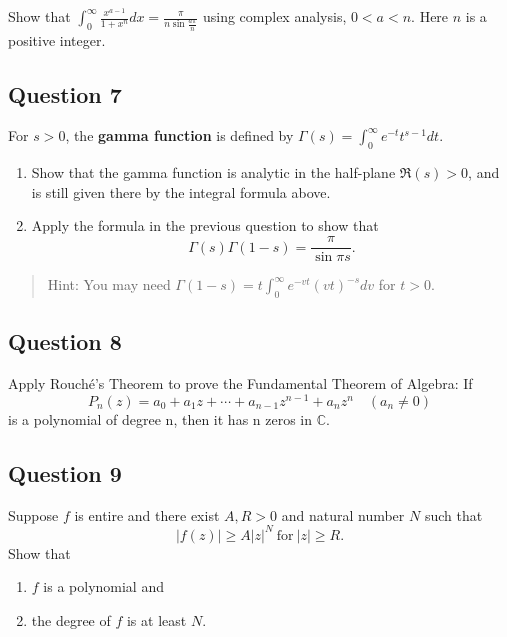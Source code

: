 \documentclass[12pt]{article}
\begin{document}
Show that
\(\displaystyle \int_0^\infty \frac{x^{a-1}}{1+x^n} dx=\frac{\pi}{n\sin \frac{a\pi}{n}}\)
using complex analysis, \(0< a < n\). Here \(n\) is a positive integer.

\hypertarget{question-7-2}{%
\subsection{Question 7}\label{question-7-2}}

For \(s>0\), the \textbf{gamma function} is defined by
\(\displaystyle{\Gamma(s)=\int_0^{\infty} e^{-t}t^{s-1} dt}\).

\begin{enumerate}
\def\labelenumi{\arabic{enumi}.}
\item
  Show that the gamma function is analytic in the half-plane
  \(\Re (s)>0\), and is still given there by the integral formula above.
\item
  Apply the formula in the previous question to show that
  \[\Gamma(s)\Gamma(1-s)=\frac{\pi}{\sin \pi s}.\]
\end{enumerate}

\begin{quote}
Hint: You may need
\(\displaystyle{\Gamma(1-s)=t \int_0^{\infty}e^{-vt}(vt)^{-s} dv}\) for
\(t>0\).
\end{quote}

\hypertarget{question-8-2}{%
\subsection{Question 8}\label{question-8-2}}

Apply Rouché's Theorem to prove the Fundamental Theorem of Algebra: If
\[P_n(z) = a_0 + a_1z + \cdots + a_{n-1}z^{n-1} + a_nz^n\quad  (a_n \neq 0)\]
is a polynomial of degree n, then it has n zeros in \(\mathbb C\).

\hypertarget{question-9-2}{%
\subsection{Question 9}\label{question-9-2}}

Suppose \(f\) is entire and there exist \(A, R >0\) and natural number
\(N\) such that \[|f(z)| \geq A |z|^N\ \text{for}\ |z| \geq R.\] Show
that

\begin{enumerate}
\def\labelenumi{(\roman{enumi})}
\item
  \(f\) is a polynomial and
\item
  the degree of \(f\) is at least \(N\).
\end{enumerate}
\end{document}

